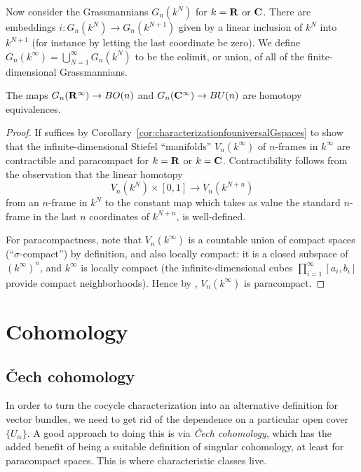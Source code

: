 \documentclass[a4paper,openany]{scrbook}
\begin{document}
Now consider the Grassmannians $G_n(k^N)$ for $k=\mathbf R$ or $\mathbf C$. There are embeddings $i\colon G_n(k^N) \to G_n(k^{N+1})$ given by a linear inclusion of $k^N$ into $k^{N+1}$ (for instance by letting the last coordinate be zero). We define $G_n(k^\infty) = \bigcup_{N=1}^\infty G_n(k^N)$ to be the colimit, or union, of all of the finite-dimensional Grassmannians. 

\begin{corollary}
The maps $G_n(\mathbf R^\infty) \to BO(n)$ and $G_n(\mathbf C^\infty) \to BU(n)$ are homotopy equivalences.
\end{corollary}
\begin{proof}
If suffices by Corollary~\ref{cor:characterizationfouniversalGspaces} to show that the infinite-dimensional Stiefel ``manifolds'' $V_n(k^\infty)$ of $n$-frames in $k^\infty$ are contractible and paracompact for $k=\mathbf R$ or $k=\mathbf C$. Contractibility follows from the observation that the linear homotopy
\[
V_n(k^N)\times [0,1] \to V_n(k^{N+n})
\]
from an $n$-frame in $k^N$ to the constant map which takes as value the standard $n$-frame in the last $n$ coordinates of $k^{N+n}$, is well-defined. 

For paracompactness, note that $V_n(k^\infty)$ is a countable union of compact spaces (``$\sigma$-compact'') by definition, and also locally compact: it is a closed subspace of $(k^\infty)^n$, and $k^\infty$ is locally compact (the infinite-dimensional cubes $\prod_{i=1}^\infty [a_i,b_i]$ provide compact neighborhoods). Hence by \cite[Thm.~I.12.11]{bredon:topology-geometry}, $V_n(k^\infty)$ is paracompact.
\end{proof}

\chapter{Cohomology} \label{ch:cohomology}

\section{Čech cohomology}\label{sec:cechcohomology}

In order to turn the cocycle characterization into an alternative definition for vector bundles, we need to get rid of the dependence on a particular open cover $\{U_\alpha\}$. A good approach to doing this is via \emph{Čech cohomology}, which has the added benefit of being a suitable definition of singular cohomology, at least for paracompact spaces. This is where characteristic classes live.
\end{document}
